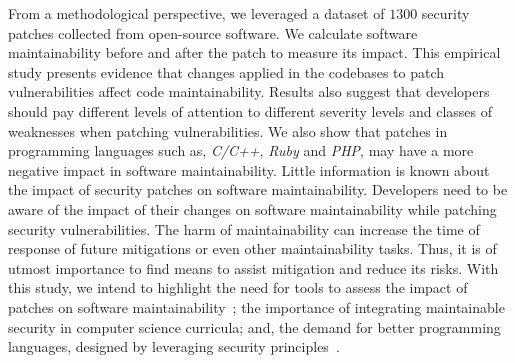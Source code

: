 \documentclass[smallextended]{svjour3}       %
\begin{document}
From a methodological perspective, we leveraged a dataset of $1300$ 
security patches collected from open-source software. We calculate 
software maintainability before and after the patch to measure its 
impact. This empirical study presents evidence that changes applied 
in the codebases to patch vulnerabilities affect code 
maintainability. Results also suggest that developers 
should pay different levels of attention to different severity 
levels and classes of weaknesses when patching vulnerabilities. We 
also show that patches in programming languages such as, 
\emph{C/C++}, \emph{Ruby} and \emph{PHP}, may have a more negative 
impact in software maintainability. Little information is known 
about the impact of security patches on software 
maintainability. Developers need to be aware of the impact of their 
changes on software maintainability while patching security 
vulnerabilities. The harm of maintainability can increase the time 
of response of future mitigations or even other maintainability 
tasks. Thus, it is of utmost importance to find means to assist 
mitigation and reduce its risks. With this study, we intend to 
highlight the need for tools to assess the impact of patches on 
software maintainability~\cite{4724577}; the importance of 
integrating maintainable security in computer science curricula; 
and, the demand for better programming languages, designed by 
leveraging security principles~\cite{kurilova2014wyvern,10.1145/2489828.2489830}. 
 
\end{document}
